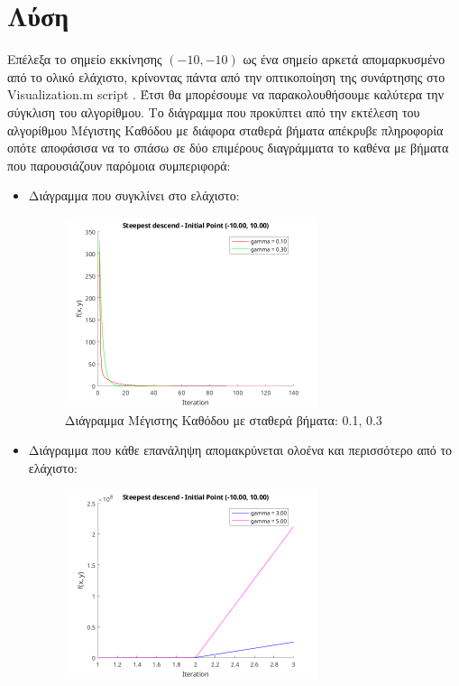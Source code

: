 \documentclass{report}
\begin{document}
\section{Λύση}
Επέλεξα το σημείο εκκίνησης $(-10,-10)$ ως ένα σημείο αρκετά απομαρκυσμένο από το ολικό ελάχιστο, 
κρίνοντας πάντα από την οπτικοποίηση της συνάρτησης στο Visualization.m script
. Έτσι θα μπορέσουμε να παρακολουθήσουμε καλύτερα την σύγκλιση του αλγορίθμου.
Το διάγραμμα που προκύπτει από την εκτέλεση του αλγορίθμου Μέγιστης Καθόδου με διάφορα σταθερά βήματα 
απέκρυβε πληροφορία οπότε αποφάσισα να το σπάσω σε δύο επιμέρους διαγράμματα το καθένα με βήματα που
παρουσιάζουν παρόμοια συμπεριφορά:
\begin{itemize}
    \item Διάγραμμα που συγκλίνει στο ελάχιστο:
    \begin{figure}[H]
        \centering
        \includegraphics[width=0.7\textwidth]{media/thema1-1.png}
        \caption{Διάγραμμα Μέγιστης Καθόδου με σταθερά βήματα: 0.1, 0.3}
    \end{figure}
    \item Διάγραμμα που κάθε επανάληψη απομακρύνεται ολοένα και περισσότερο από το ελάχιστο:
    \begin{figure}[H]
        \centering
        \includegraphics[width=0.7\textwidth]{media/thema1-2.png}

\end{figure}
\end{itemize}
\end{document}
